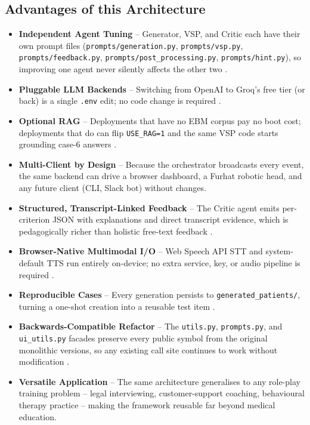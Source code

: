 \documentclass{article}
\begin{document}
\subsection{Advantages of this Architecture}
\begin{itemize}
    \item \textbf{Independent Agent Tuning} -- Generator, VSP, and Critic each have their own prompt files (\texttt{prompts/generation.py}, \texttt{prompts/vsp.py}, \texttt{prompts/feedback.py}, \texttt{prompts/post\_processing.py}, \texttt{prompts/hint.py}), so improving one agent never silently affects the other two \cite{Cheptsov2013IntroducingAN}.

    \item \textbf{Pluggable LLM Backends} -- Switching from OpenAI to Groq's free tier (or back) is a single \texttt{.env} edit; no code change is required \cite{Kulkarni2023TheEO}.

    \item \textbf{Optional RAG} -- Deployments that have no EBM corpus pay no boot cost; deployments that do can flip \texttt{USE\_RAG=1} and the same VSP code starts grounding case-6 answers \cite{Monir2024VectorSearchED}.

    \item \textbf{Multi-Client by Design} -- Because the orchestrator broadcasts every event, the same backend can drive a browser dashboard, a Furhat robotic head, and any future client (CLI, Slack bot) without changes.

    \item \textbf{Structured, Transcript-Linked Feedback} -- The Critic agent emits per-criterion JSON with explanations and direct transcript evidence, which is pedagogically richer than holistic free-text feedback \cite{Krugmann2024SentimentAI}.

    \item \textbf{Browser-Native Multimodal I/O} -- Web Speech API STT and system-default TTS run entirely on-device; no extra service, key, or audio pipeline is required \cite{Beloki2017ASA}.

    \item \textbf{Reproducible Cases} -- Every generation persists to \texttt{generated\_patients/}, turning a one-shot creation into a reusable test item \cite{Mahajan2022TextualDQ}.

    \item \textbf{Backwards-Compatible Refactor} -- The \texttt{utils.py}, \texttt{prompts.py}, and \texttt{ui\_utils.py} facades preserve every public symbol from the original monolithic versions, so any existing call site continues to work without modification \cite{Rygl2017SemanticVE}.

    \item \textbf{Versatile Application} -- The same architecture generalises to any role-play training problem -- legal interviewing, customer-support coaching, behavioural therapy practice -- making the framework reusable far beyond medical education.
\end{itemize}
\end{document}
